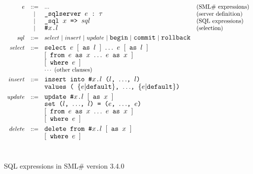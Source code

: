 \documentclass{jbook}
\newcommand{\txt}[2]{#2}
\newcommand{\smlsharp}{SML\#}
\newcommand{\version}{3.4.0}
\newcommand{\code}[1]{\mbox{\large\tt #1}}
\newcommand{\vbar}{\mbox{\ $|$\ }}
\begin{document}
\begin{figure}
\begin{center}
\[
\begin{array}{rcll}
  e &::=& ... & \mbox{(\smlsharp{} expressions)}
\\  &\vbar& \code{\_sqlserver $e$~:~$\tau$} 
	& \mbox{(server definition)}
\\  &\vbar& \code{\_sql $x$ => $sql$} 
	& \mbox{(SQL expressions)}
\\  &\vbar& \code{\#$x$.$l$}
	& \mbox{(selection)}
\\[1ex]
  sql &::=& select
\vbar insert
\vbar update
\vbar \code{begin}
\vbar \code{commit}
\vbar \code{rollback}
\\[1ex]
select &::=& 
     \code{select $e$ $[$ as $l$ $]$ $\ldots$ $e$ $[$ as $l$ $]$}
\\&& \code{$[$ from $e$ as $x$ $\ldots$ $e$ as $x$ $]$}
\\&& \code{$[$ where $e$ $]$}
\\&& \cdots\ \mbox{(other clauses)}
\\[1ex]
insert &::=& 
\code{insert into \#$x$.$l$ ($l$, $\ldots$, $l$)}
\\&& \code{values ( $\{e|$default$\}$, $\ldots$, $\{e|$default$\}$)}
\\[1ex]
update &::=& 
   \code{update \#$x$.$l$ $[$ as $x$ $]$}
\\&& \code{set ($l$, $\ldots$, $l$) = ($e$, $\ldots$, $e$)}
\\&& \code{$[$ from $e$ as $x$ $\ldots$ $e$ as $x$ $]$}
\\&& \code{$[$ where $e$ $]$}
\\[1ex]
delete &::=& 
   \code{delete from \#$x$.$l$ $[$ as $x$ $]$}
\\&& \code{$[$ where $e$ $]$}
\end{array}
\]
\ \\
\caption{\txt{\smlsharp{}第\version{}版のSQL構文概要}{SQL expressions in \smlsharp{} version \version{}}}
\end{center}
\label{fig:sqlSyntax}
\end{figure}
\end{document}
